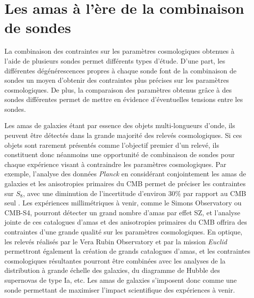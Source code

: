 \section*{Les amas à l'ère de la combinaison de sondes}

La combinaison des contraintes sur les paramètres cosmologiques obtenues à l'aide de plusieurs sondes permet différents types d'étude.
D'une part, les différentes dégénérescences propres à chaque sonde font de la combinaison de sondes un moyen d'obtenir des contraintes plus précises sur les paramètres cosmologiques.
De plus, la comparaison des paramètres obtenus grâce à des sondes différentes permet de mettre en évidence d'éventuelles tensions entre les sondes.

Les amas de galaxies étant par essence des objets multi-longueurs d'onde, ils peuvent être détectés dans la grande majorité des relevés cosmologiques.
Si ces objets sont rarement présentés comme l'objectif premier d'un relevé, ils constituent donc néanmoins une opportunité de combinaison de sondes pour chaque expérience visant à contraindre les paramètres cosmologiques.
Par exemple, l'analyse des données \textit{Planck} en considérant conjointement les amas de galaxies et les anisotropies primaires du CMB permet de préciser les contraintes sur $S_8$, avec une diminution de l'incertitude d'environ 30\% par rapport au CMB seul \cite{salvati_constraints_2018}.
Les expériences millimétriques à venir, comme le Simons Observatory ou CMB-S4, pourront détecter un grand nombre d'amas par effet SZ, et l'analyse jointe de ces catalogues d'amas et des anisotropies primaires du CMB offrira des contraintes d'une grande qualité sur les paramètres cosmologiques.
En optique, les relevés réalisés par le Vera Rubin Observatory et par la mission \textit{Euclid} permettront également la création de grands catalogues d'amas, et les contraintes cosmologiques résultantes pourront être combinées avec les analyses de la distribution à grande échelle des galaxies, du diagramme de Hubble des supernovas de type Ia, etc.
Les amas de galaxies s'imposent donc comme une sonde permettant de maximiser l'impact scientifique des expériences à venir.

